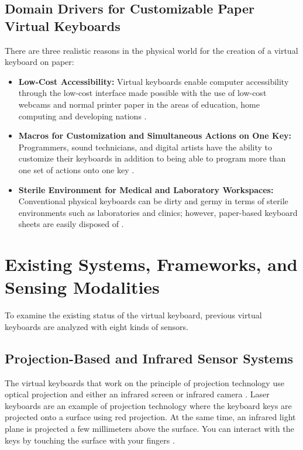 \subsection{Domain Drivers for Customizable Paper Virtual Keyboards}
\label{subsec:lit_domain_drivers}
There are three realistic reasons in the physical world for the creation of a virtual keyboard on paper:
\begin{itemize}
    \item \textbf{Low-Cost Accessibility:} Virtual keyboards enable computer accessibility through the low-cost interface made possible with the use of low-cost webcams and normal printer paper in the areas of education, home computing and developing nations \cite{Khare2019QWERTY, Sreenath2021Monocular}.
    \item \textbf{Macros for Customization and Simultaneous Actions on One Key:} Programmers, sound technicians, and digital artists have the ability to customize their keyboards in addition to being able to program more than one set of actions onto one key \cite{ReviewVirtualKeyboard2020}.
    \item \textbf{Sterile Environment for Medical and Laboratory Workspaces:} Conventional physical keyboards can be dirty and germy in terms of sterile environments such as laboratories and clinics; however, paper-based keyboard sheets are easily disposed of \cite{ReviewVirtualKeyboard2020}.
\end{itemize}

\section{Existing Systems, Frameworks, and Sensing Modalities}
\label{sec:lit_existing_systems}
To examine the existing status of the virtual keyboard, previous virtual keyboards are analyzed with eight kinds of sensors.

\subsection{Projection-Based and Infrared Sensor Systems}
\label{subsec:lit_proj_systems}
The virtual keyboards that work on the principle of projection technology use optical projection and either an infrared screen or infrared camera \cite{Kudale2016RealTime, Cheng2015Fingertip}. Laser keyboards are an example of projection technology where the keyboard keys are projected onto a surface using red projection. At the same time, an infrared light plane is projected a few millimeters above the surface. You can interact with the keys by touching the surface with your fingers \cite{Cheng2015Fingertip}.

